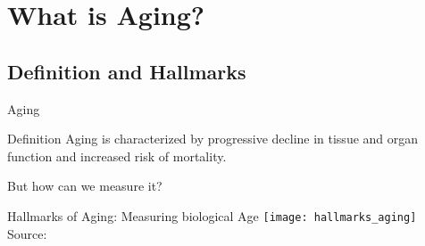 \section{What is Aging?}

\subsection{Definition and Hallmarks}

\begin{frame}[c]{Aging}
    \large

    \begin{block}{Definition \cite{sen2016epigenetic}}
        Aging is characterized by progressive decline in tissue and organ
        function and increased risk of mortality.
    \end{block}
    \pause
    But how can we measure it?
\end{frame}


\begin{frame}[c]{Hallmarks of Aging: Measuring biological Age}
    \texttt{[image: hallmarks\_aging]} \\
    \scriptsize
    Source: \cite{lopez2013hallmarks}
\end{frame}

